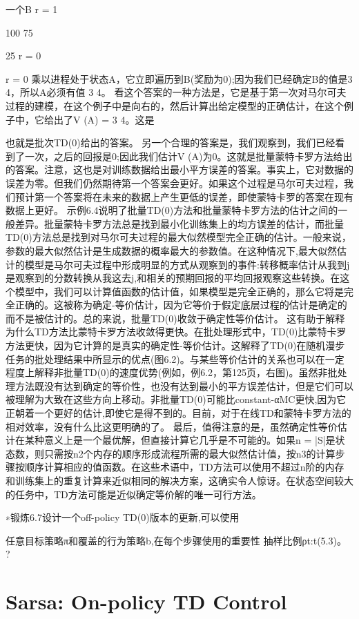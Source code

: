 一个B
r = 1


100%
75%

25%
r = 0

r = 0
乘以进程处于状态A，它立即遍历到B(奖励为0);因为我们已经确定B的值是3 4，所以A必须有值
3
4。
看这个答案的一种方法是，它是基于第一次对马尔可夫过程的建模，在这个例子中是向右的，然后计算出给定模型的正确估计，在这个例子中，它给出了V (A) = 3 4。这是

也就是批次TD(0)给出的答案。
另一个合理的答案是，我们观察到，我们已经看到了一次，之后的回报是0;因此我们估计V (A)为0。这就是批量蒙特卡罗方法给出的答案。注意，这也是对训练数据给出最小平方误差的答案。事实上，它对数据的误差为零。但我们仍然期待第一个答案会更好。如果这个过程是马尔可夫过程，我们预计第一个答案将在未来的数据上产生更低的误差，即使蒙特卡罗的答案在现有数据上更好。
示例6.4说明了批量TD(0)方法和批量蒙特卡罗方法的估计之间的一般差异。批量蒙特卡罗方法总是找到最小化训练集上的均方误差的估计，而批量TD(0)方法总是找到对马尔可夫过程的最大似然模型完全正确的估计。一般来说，参数的最大似然估计是生成数据的概率最大的参数值。在这种情况下,最大似然估计的模型是马尔可夫过程中形成明显的方式从观察到的事件:转移概率估计从我到j是观察到的分数转换从我这去j,和相关的预期回报的平均回报观察这些转换。在这个模型中，我们可以计算值函数的估计值，如果模型是完全正确的，那么它将是完全正确的。这被称为确定-等价估计，因为它等价于假定底层过程的估计是确定的而不是被估计的。总的来说，批量TD(0)收敛于确定性等价估计。
这有助于解释为什么TD方法比蒙特卡罗方法收敛得更快。在批处理形式中，TD(0)比蒙特卡罗方法更快，因为它计算的是真实的确定性-等价估计。这解释了TD(0)在随机漫步任务的批处理结果中所显示的优点(图6.2)。与某些等价估计的关系也可以在一定程度上解释非批量TD(0)的速度优势(例如，例6.2，第125页，右图)。虽然非批处理方法既没有达到确定的等价性，也没有达到最小的平方误差估计，但是它们可以被理解为大致在这些方向上移动。非批量TD(0)可能比constant-αMC更快,因为它正朝着一个更好的估计,即使它是得不到的。目前，对于在线TD和蒙特卡罗方法的相对效率，没有什么比这更明确的了。
最后，值得注意的是，虽然确定性等价估计在某种意义上是一个最优解，但直接计算它几乎是不可能的。如果n = |S|是状态数，则只需按n2个内存的顺序形成流程所需的最大似然估计值，按n3的计算步骤按顺序计算相应的值函数。在这些术语中，TD方法可以使用不超过n阶的内存和训练集上的重复计算来近似相同的解决方案，这确实令人惊讶。在状态空间较大的任务中，TD方法可能是近似确定等价解的唯一可行方法。

∗锻炼6.7设计一个off-policy TD(0)版本的更新,可以使用

任意目标策略π和覆盖的行为策略b,在每个步骤使用的重要性
抽样比例ρt:t(5.3)。 					?

\section{Sarsa: On-policy TD Control}

